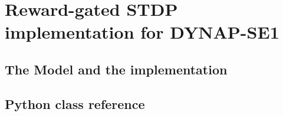  \chapter{Reward-gated STDP implementation for DYNAP-SE1}
 \label{appendix:RLSTDP_implementation}

 \section{The Model and the implementation}



 \section{Python class reference}

 